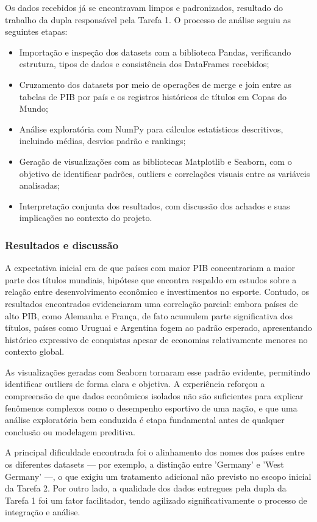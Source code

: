 \documentclass[12pt, a4paper, brazil]{article}
\begin{document}
Os dados recebidos já se encontravam limpos e padronizados, resultado do trabalho da dupla responsável pela Tarefa 1. O processo de análise seguiu as seguintes etapas:

\begin{itemize}
    \item Importação e inspeção dos datasets com a biblioteca Pandas, verificando estrutura, tipos de dados e consistência dos DataFrames recebidos;
    \item Cruzamento dos datasets por meio de operações de merge e join entre as tabelas de PIB por país e os registros históricos de títulos em Copas do Mundo;
    \item Análise exploratória com NumPy para cálculos estatísticos descritivos, incluindo médias, desvios padrão e rankings;
    \item Geração de visualizações com as bibliotecas Matplotlib e Seaborn, com o objetivo de identificar padrões, outliers e correlações visuais entre as variáveis analisadas;
    \item Interpretação conjunta dos resultados, com discussão dos achados e suas implicações no contexto do projeto.
\end{itemize}

\subsubsection{Resultados e discussão}
A expectativa inicial era de que países com maior PIB concentrariam a maior parte dos títulos mundiais, hipótese que encontra respaldo em estudos sobre a relação entre desenvolvimento econômico e investimentos no esporte. Contudo, os resultados encontrados evidenciaram uma correlação parcial: embora países de alto PIB, como Alemanha e França, de fato acumulem parte significativa dos títulos, países como Uruguai e Argentina fogem ao padrão esperado, apresentando histórico expressivo de conquistas apesar de economias relativamente menores no contexto global.

As visualizações geradas com Seaborn tornaram esse padrão evidente, permitindo identificar outliers de forma clara e objetiva. A experiência reforçou a compreensão de que dados econômicos isolados não são suficientes para explicar fenômenos complexos como o desempenho esportivo de uma nação, e que uma análise exploratória bem conduzida é etapa fundamental antes de qualquer conclusão ou modelagem preditiva.

A principal dificuldade encontrada foi o alinhamento dos nomes dos países entre os diferentes datasets — por exemplo, a distinção entre 'Germany' e 'West Germany' —, o que exigiu um tratamento adicional não previsto no escopo inicial da Tarefa 2. Por outro lado, a qualidade dos dados entregues pela dupla da Tarefa 1 foi um fator facilitador, tendo agilizado significativamente o processo de integração e análise.
\end{document}
